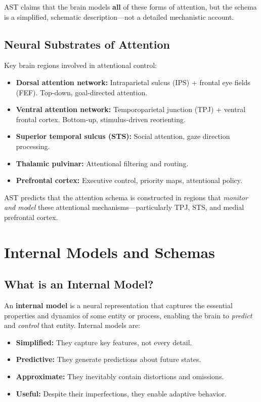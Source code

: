 \documentclass[11pt,a4paper]{report}
\begin{document}
AST claims that the brain models \textbf{all} of these forms of attention, but the schema is a simplified, schematic description---not a detailed mechanistic account.

\subsection{Neural Substrates of Attention}

Key brain regions involved in attentional control:

\begin{mechbox}
\begin{itemize}[leftmargin=1.5em]
  \item \textbf{Dorsal attention network:} Intraparietal sulcus (IPS) + frontal eye fields (FEF). Top-down, goal-directed attention.
  \item \textbf{Ventral attention network:} Temporoparietal junction (TPJ) + ventral frontal cortex. Bottom-up, stimulus-driven reorienting.
  \item \textbf{Superior temporal sulcus (STS):} Social attention, gaze direction processing.
  \item \textbf{Thalamic pulvinar:} Attentional filtering and routing.
  \item \textbf{Prefrontal cortex:} Executive control, priority maps, attentional policy.
\end{itemize}
AST predicts that the attention schema is constructed in regions that \emph{monitor and model} these attentional mechanisms---particularly TPJ, STS, and medial prefrontal cortex.
\end{mechbox}

\section{Internal Models and Schemas}

\subsection{What is an Internal Model?}

\begin{definitionbox}
An \textbf{internal model} is a neural representation that captures the essential properties and dynamics of some entity or process, enabling the brain to \emph{predict} and \emph{control} that entity. Internal models are:
\begin{itemize}[leftmargin=1.5em]
  \item \textbf{Simplified:} They capture key features, not every detail.
  \item \textbf{Predictive:} They generate predictions about future states.
  \item \textbf{Approximate:} They inevitably contain distortions and omissions.
  \item \textbf{Useful:} Despite their imperfections, they enable adaptive behavior.
\end{itemize}
\end{definitionbox}
\end{document}
